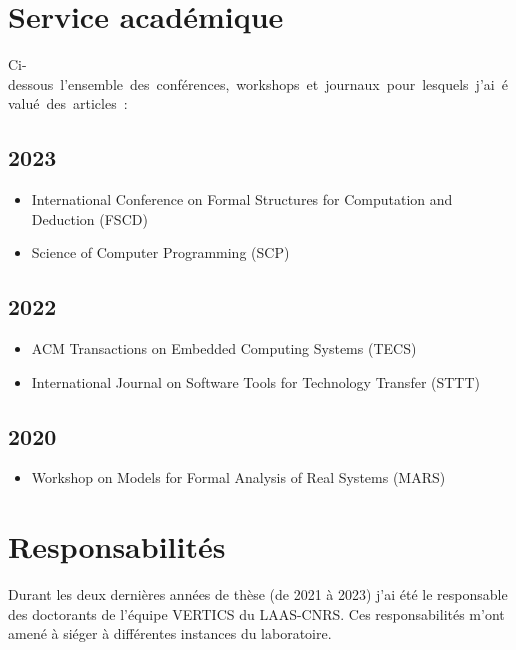 \label{sec:resp}

\vspace{10pt}
\section{Service académique}
\vspace{10pt}

\mbox{Ci-dessous l'ensemble des conférences, workshops et journaux pour lesquels j'ai évalué des articles :}

\vspace{5pt}
\subsection*{2023}
\vspace{5pt}

\begin{itemize}
    \item International Conference on Formal Structures for Computation and
    Deduction (FSCD)

    \item Science of Computer Programming (SCP)
\end{itemize}

\vspace{5pt}
\subsection*{2022}
\vspace{5pt}

\begin{itemize}
    \item ACM Transactions on Embedded Computing Systems (TECS)

    \item International Journal on Software Tools for Technology Transfer (STTT)
\end{itemize}
\vspace{5pt}
\subsection*{2020}
\vspace{5pt}

\begin{itemize}
    \item Workshop on Models for Formal Analysis of Real Systems (MARS)
\end{itemize}

\vspace{10pt}
\section{Responsabilités}
\vspace{10pt}

Durant les deux dernières années de thèse (de 2021 à 2023) j'ai été le responsable des
doctorants de l'équipe VERTICS du LAAS-CNRS. Ces responsabilités m'ont amené à
siéger à différentes instances du laboratoire. 
